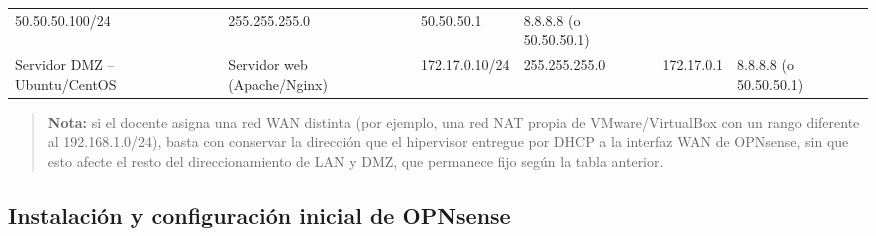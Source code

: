 \documentclass{article}
\renewcommand{\_}{\oldunderscore\hskip0pt\relax}
\begin{document}
{\begin{longtable}[]{@{}llllll@{}}
\begin{minipage}[t]{0.151\columnwidth}
50.50.50.100/24\strut
\end{minipage} & \begin{minipage}[t]{0.155\columnwidth}\raggedright
255.255.255.0\strut
\end{minipage} & \begin{minipage}[t]{0.134\columnwidth}\raggedright
50.50.50.1\strut
\end{minipage} & \begin{minipage}[t]{0.118\columnwidth}\raggedright
8.8.8.8 (o 50.50.50.1)\strut
\end{minipage}\tabularnewline
\begin{minipage}[t]{0.168\columnwidth}\raggedright
Servidor DMZ -- Ubuntu/CentOS\strut
\end{minipage} & \begin{minipage}[t]{0.143\columnwidth}\raggedright
Servidor web (Apache/Nginx)\strut
\end{minipage} & \begin{minipage}[t]{0.151\columnwidth}\raggedright
172.17.0.10/24\strut
\end{minipage} & \begin{minipage}[t]{0.155\columnwidth}\raggedright
255.255.255.0\strut
\end{minipage} & \begin{minipage}[t]{0.134\columnwidth}\raggedright
172.17.0.1\strut
\end{minipage} & \begin{minipage}[t]{0.118\columnwidth}\raggedright
8.8.8.8 (o 50.50.50.1)\strut
\end{minipage}\tabularnewline
\bottomrule
\end{longtable}}

\begin{quote}
\textbf{Nota:} si el docente asigna una red WAN distinta (por ejemplo,
una red NAT propia de VMware/VirtualBox con un rango diferente al
192.168.1.0/24), basta con conservar la dirección que el hipervisor
entregue por DHCP a la interfaz WAN de OPNsense, sin que esto afecte el
resto del direccionamiento de LAN y DMZ, que permanece fijo según la
tabla anterior.
\end{quote}

\hypertarget{instalaciuxf3n-y-configuraciuxf3n-inicial-de-opnsense}{%
\subsection{Instalación y configuración inicial de
OPNsense}\label{instalaciuxf3n-y-configuraciuxf3n-inicial-de-opnsense}}
\end{document}
